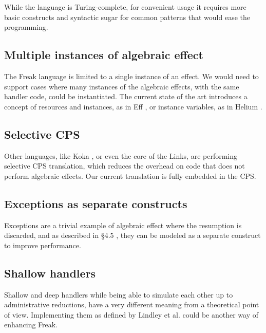 \documentclass{article}
\theoremstyle{definition}
\theoremstyle{lemma}
\theoremstyle{observation}
\theoremstyle{theorem}
\begin{document}
    While the language is Turing-complete, for convenient usage it
    requires more basic constructs and syntactic sugar for common patterns
    that would ease the programming.

    \subsection{Multiple instances of algebraic effect}

    The Freak language is limited to a single instance of an effect. We would
    need to support cases where many instances of the algebraic effects, with
    the same handler code, could be instantiated. The current state of the
    art introduces a concept of resources and instances, as in Eff \cite{programming-in-eff},
    or instance variables, as in Helium \cite{binders-labels}.

    \subsection{Selective CPS}

    Other languages, like Koka \cite{leijen-koka}, or even the core of the Links, are
    performing selective CPS translation, which reduces the overhead on code
    that does not perform algebraic effects. Our current translation is fully
    embedded in the CPS.

    \subsection{Exceptions as separate constructs}

    Exceptions are a trivial example of algebraic effect where the resumption is
    discarded, and as described in \S 4.5 \cite{handlers-cps}, they can be modeled
    as a separate construct to improve performance.

    \subsection{Shallow handlers}

    Shallow and deep handlers while being able to simulate each other up to
    administrative reductions, have a very different meaning from a theoretical
    point of view. Implementing them as defined by Lindley et al. \cite{shallow-handlers} could
    be another way of enhancing Freak.

\printbibliography
\end{document}
